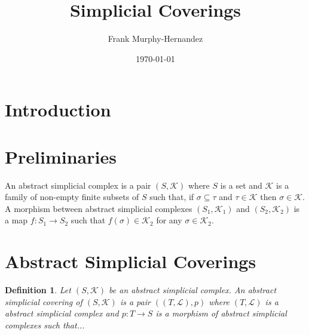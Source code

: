 \documentclass{amsart}
\newtheorem{definition}{Definition}[section]
\begin{document}
\title{Simplicial Coverings}

\author{Frank Murphy-Hernandez}
\address{Facultad de Ciencias, UNAM, Mexico City}


\date{\today}


\begin{abstract}

\end{abstract}

\maketitle

\section*{Introduction}



\section{Preliminaries}


\cite{goerss2009simplicial}
\cite{may1992simplicial}

An abstract simplicial complex is a pair $(S,\mathcal{K})$ where $S$ is a set and $\mathcal{K}$ is a family of non-empty finite subsets of $S$ such that, if $\sigma\subseteq \tau$ and $\tau\in \mathcal{K}$ then $\sigma\in\mathcal{K}$. A morphism between  abstract simplicial complexes $(S_1,\mathcal{K}_1)$ and $(S_2,\mathcal{K}_2)$ is a map $f\colon S_1\longrightarrow S_2$ such that $f(\sigma)\in \mathcal{K}_2$ for any $\sigma\in\mathcal{K}_2$.

\section{Abstract Simplicial Coverings}


\begin{definition}
Let $(S,\mathcal{K})$ be an abstract simplicial complex. An abstract simplicial covering of $(S,\mathcal{K})$ is a pair $((T,\mathcal{L}),p)$ where $(T,\mathcal{L})$ is a abstract simplicial complex and $p\colon T\longrightarrow S$ is a morphism of abstract simplicial complexes such that...
\end{definition}
\end{document}

